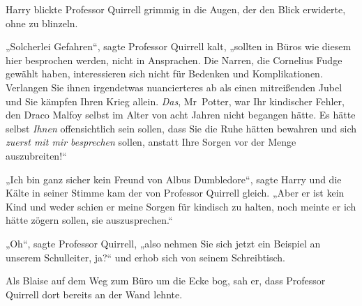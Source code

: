 Harry blickte Professor Quirrell grimmig in die Augen, der den Blick erwiderte, ohne zu blinzeln.

„Solcherlei Gefahren“, sagte Professor Quirrell kalt, „sollten in Büros wie diesem hier besprochen werden, nicht in Ansprachen. Die Narren, die Cornelius Fudge gewählt haben, interessieren sich nicht für Bedenken und Komplikationen. Verlangen Sie ihnen irgendetwas nuancierteres ab als einen mitreißenden Jubel und Sie kämpfen Ihren Krieg allein. \emph{Das}, Mr~Potter, war Ihr kindischer Fehler, den Draco Malfoy selbst im Alter von acht Jahren nicht begangen hätte. Es hätte selbst \emph{Ihnen} offensichtlich sein sollen, dass Sie die Ruhe hätten bewahren und sich \emph{zuerst mit mir besprechen} sollen, anstatt Ihre Sorgen vor der Menge auszubreiten!“

„Ich bin ganz sicher kein Freund von Albus Dumbledore“, sagte Harry und die Kälte in seiner Stimme kam der von Professor Quirrell gleich.
„Aber er ist kein Kind und weder schien er meine Sorgen für kindisch zu halten, noch meinte er ich hätte zögern sollen, sie auszusprechen.“

„Oh“, sagte Professor Quirrell, „also nehmen Sie sich jetzt ein Beispiel an unserem Schulleiter, ja?“ und erhob sich von seinem Schreibtisch.

\later

Als Blaise auf dem Weg zum Büro um die Ecke bog, sah er, dass Professor Quirrell dort bereits an der Wand lehnte.

